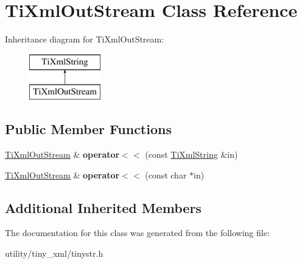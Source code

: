 \hypertarget{class_ti_xml_out_stream}{}\section{Ti\+Xml\+Out\+Stream Class Reference}
\label{class_ti_xml_out_stream}
Inheritance diagram for Ti\+Xml\+Out\+Stream\+:\begin{figure}[H]
\begin{center}
\leavevmode
\includegraphics[height=2.000000cm]{class_ti_xml_out_stream}
\end{center}
\end{figure}
\subsection*{Public Member Functions}
\begin{DoxyCompactItemize}
\item 
\mbox{\label{class_ti_xml_out_stream_a3640dcb1c0903be3bc6966cdc9a79db6}} 
\hyperlink{class_ti_xml_out_stream}{Ti\+Xml\+Out\+Stream} \& {\bfseries operator$<$$<$} (const \hyperlink{class_ti_xml_string}{Ti\+Xml\+String} \&in)
\item 
\mbox{\label{class_ti_xml_out_stream_af2117e5a8cbfcb69544804ad2859bfb6}} 
\hyperlink{class_ti_xml_out_stream}{Ti\+Xml\+Out\+Stream} \& {\bfseries operator$<$$<$} (const char $\ast$in)
\end{DoxyCompactItemize}
\subsection*{Additional Inherited Members}


The documentation for this class was generated from the following file\+:\begin{DoxyCompactItemize}
\item 
utility/tiny\+\_\+xml/tinystr.\+h\end{DoxyCompactItemize}
